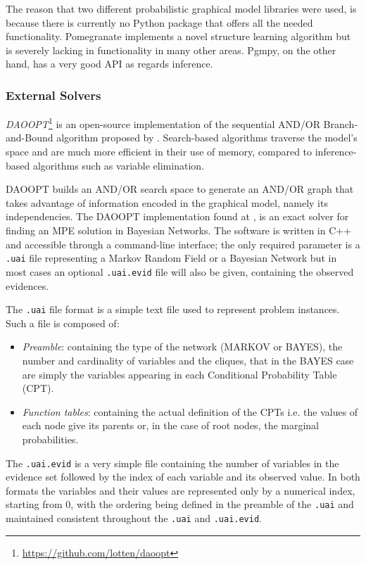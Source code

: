 The reason that two different probabilistic graphical model libraries were used, is because there is currently no Python package that offers all the needed functionality.
Pomegranate implements a novel structure learning algorithm but is severely lacking in functionality in many other areas.
Pgmpy, on the other hand, has a very good API as regards inference.

\subsubsection{External Solvers}
\textit{DAOOPT}\footnote{\url{https://github.com/lotten/daoopt}} is an open-source implementation of the sequential AND/OR Branch-and-Bound algorithm proposed by \citet{Marinescu2006}.
Search-based algorithms traverse the model's space and are much more efficient in their use of memory, compared to inference-based algorithms such as variable elimination.

DAOOPT builds an AND/OR search space to generate an AND/OR graph that takes advantage of information encoded in the graphical model, namely its independencies.
The DAOOPT implementation found at \citet{daoopt}, is an exact solver for finding an MPE solution in Bayesian Networks.
The software is written in C++ and accessible through a command-line interface; the only required parameter is a \texttt{.uai} file representing a Markov Random Field or a Bayesian Network but in most cases an optional \texttt{.uai.evid} file will also be given, containing the observed evidences.

The \texttt{.uai} file format is a simple text file used to represent problem instances.
Such a file is composed of:
\begin{itemize}
  \item \textit{Preamble}: containing the type of the network (MARKOV or BAYES), the number and cardinality of variables and the cliques, that in the BAYES case are simply the variables appearing in each Conditional Probability Table (CPT).
  \item \textit{Function tables}: containing the actual definition of the CPTs i.e. the values of each node give its parents or, in the case of root nodes, the marginal probabilities.
\end{itemize}

The \texttt{.uai.evid} is a very simple file containing the number of variables in the evidence set followed by the index of each variable and its observed value.
In both formats the variables and their values are represented only by a numerical index, starting from $0$, with the ordering being defined in the preamble of the \texttt{.uai} and maintained consistent throughout the \texttt{.uai} and \texttt{.uai.evid}.

